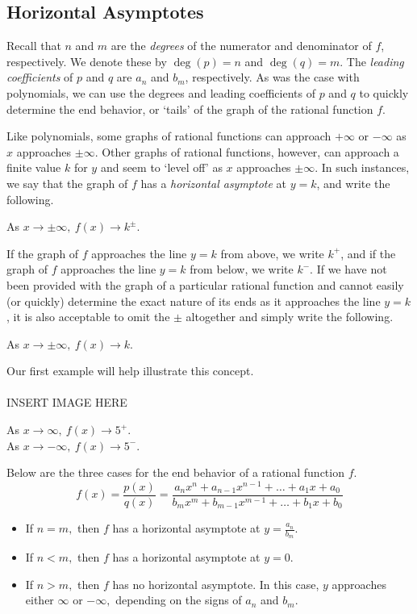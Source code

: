 {}\pp
\subsection{Horizontal Asymptotes}
\noindent
Recall that $n$ and $m$ are the \textit{degrees} of the numerator and denominator of $f$, respectively.  We denote these by $\deg(p)=n$ and $\deg(q)=m$.  The \textit{leading coefficients} of $p$ and $q$ are $a_n$ and $b_m$, respectively.  As was the case with polynomials, we can use the degrees and leading coefficients of $p$ and $q$ to quickly determine the end behavior, or `tails' of the graph of the rational function $f$.\pp

Like polynomials, some graphs of rational functions can approach $+\infty$ or $-\infty$ as $x$ approaches $\pm\infty$.  Other graphs of rational functions, however, can approach a finite value $k$ for $y$ and seem to `level off' as $x$ approaches $\pm\infty$.  In such instances, we say that the graph of $f$ has a \textit{horizontal asymptote} at $y=k$, and write the following.
\begin{center}
As $x\longrightarrow\pm\infty,~f(x)\longrightarrow k^{\pm}$.
\end{center}
If the graph of $f$ approaches the line $y=k$ from above, we write $k^+$, and if the graph of $f$ approaches the line $y=k$ from below, we write $k^-$. If we have not been provided with the graph of a particular rational function and cannot easily (or quickly) determine the exact nature of its ends as it approaches the line $y=k$, it is also acceptable to omit the $\pm$ altogether and simply write the following.
\begin{center}
As $x\longrightarrow\pm\infty,~f(x)\longrightarrow k$.
\end{center}
Our first example will help illustrate this concept.\\
~\\
INSERT IMAGE HERE
~\\
\begin{center}
As $x\longrightarrow\infty,~f(x)\longrightarrow 5^{+}$.\\
As $x\longrightarrow -\infty,~f(x)\longrightarrow 5^{-}$.
\end{center}
\newpage
Below are the three cases for the end behavior of a rational function $f$.
$$f(x)=\frac{p(x)}{q(x)}=\frac{a_nx^n+a_{n-1}x^{n-1}+\ldots+a_1x+a_0}{b_mx^m+b_{m-1}x^{m-1}+\ldots+b_1x+b_0}$$
\begin{itemize}
	\item If $n=m,$ then $f$ has a horizontal asymptote at $y=\displaystyle\frac{a_n}{b_m}$.
	\item If $n<m,$ then $f$ has a horizontal asymptote at $y=0$.
	\item If $n>m,$ then $f$ has no horizontal asymptote.  In this case, $y$ approaches either $\infty$ or $-\infty,$ depending on the signs of $a_n$ and $b_m$.
\end{itemize}

